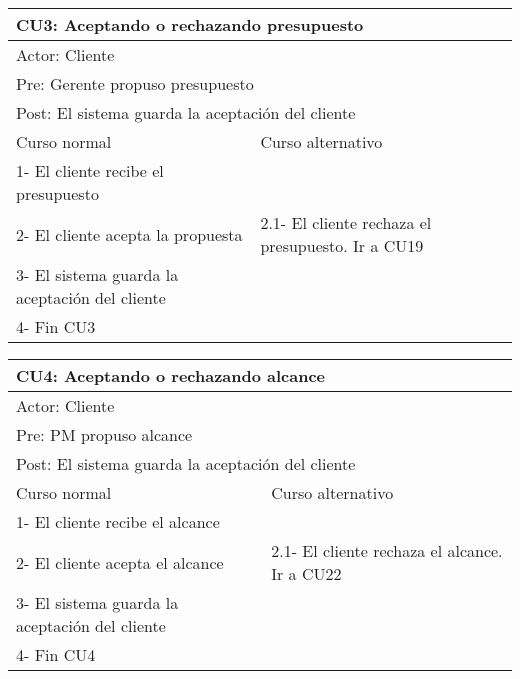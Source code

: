 \begin{table}[H]
  \begin{adjustbox}{max width = \textwidth}
  \begin{tabular}{|l|l|}
    \hline
    \multicolumn{2}{|l|}{CU3: Aceptando o rechazando presupuesto} \\\hline
    \multicolumn{2}{|l|}{Actor: Cliente} \\\hline
    \multicolumn{2}{|l|}{Pre: Gerente propuso presupuesto} \\\hline
    \multicolumn{2}{|l|}{Post: El sistema guarda la aceptación del cliente} \\\hline
     Curso normal & Curso alternativo\\ \hline
     1- El cliente recibe el presupuesto & \\ \hline
     2- El cliente acepta la propuesta & 2.1- El cliente rechaza el presupuesto. Ir a CU19\\ \hline
     3- El sistema guarda la aceptación del cliente &\\ \hline
     4- Fin CU3 & \\ \hline
  \end{tabular}
  \end{adjustbox}
\end{table}

\begin{table}[H]
  \begin{adjustbox}{max width = \textwidth}
  \begin{tabular}{|l|l|}
    \hline
    \multicolumn{2}{|l|}{CU4: Aceptando o rechazando alcance} \\\hline
    \multicolumn{2}{|l|}{Actor: Cliente} \\\hline
    \multicolumn{2}{|l|}{Pre: PM propuso alcance} \\\hline
    \multicolumn{2}{|l|}{Post: El sistema guarda la aceptación del cliente} \\\hline
     Curso normal & Curso alternativo\\ \hline
     1- El cliente recibe el alcance & \\ \hline
     2- El cliente acepta el alcance & 2.1- El cliente rechaza el alcance. Ir a CU22\\ \hline
     3- El sistema guarda la aceptación del cliente  &\\ \hline
     4- Fin CU4 & \\ \hline
  \end{tabular}
  \end{adjustbox}
\end{table}

